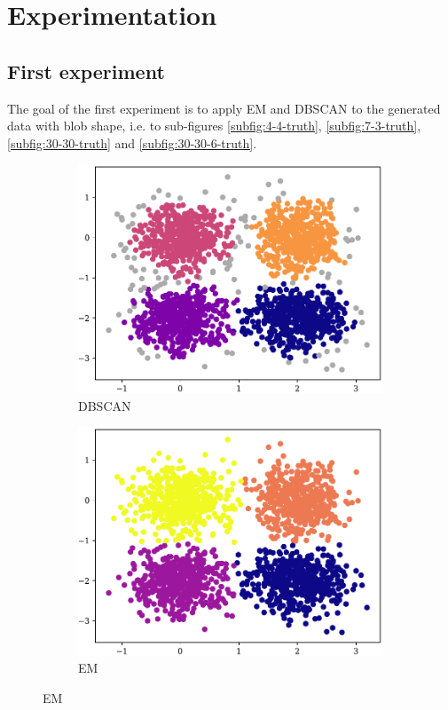 \section{Experimentation}
\label{sec:experimentation}
\subsection{First experiment}
The goal of the first experiment is to apply EM and DBSCAN to the generated data with blob shape, i.e. to sub-figures \ref{subfig:4-4-truth}, \ref{subfig:7-3-truth}, \ref{subfig:30-30-truth} and \ref{subfig:30-30-6-truth}.

\begin{figure}[t!]
    \begin{subfigure}[b]{0.45\textwidth}
        \includegraphics[width=\textwidth]{../plots/4-4_pred_dbscan.pdf}
        \caption{DBSCAN}
        \label{subfig:4-4-dbscan}
    \end{subfigure}
    \hspace{0.09\textwidth}
    \begin{subfigure}[b]{0.45\textwidth}
            \includegraphics[width=\textwidth]{../plots/4-4_pred_em.pdf}
            \caption{EM}
            \label{subfig:4-4-em}
    \end{subfigure}
\end{figure}
